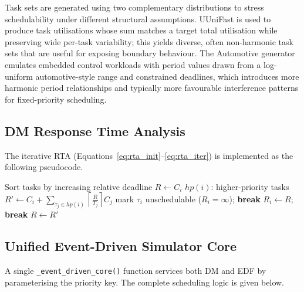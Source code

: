\documentclass[12pt,a4paper]{article}
\begin{document}
Task sets are generated using two complementary distributions to stress schedulability under different structural assumptions. UUniFast \cite{bini2005} is used to produce task utilisations whose sum matches a target total utilisation while preserving wide per-task variability; this yields diverse, often non-harmonic task sets that are useful for exposing boundary behaviour. The Automotive generator emulates embedded control workloads with period values drawn from a log-uniform automotive-style range and constrained deadlines, which introduces more harmonic period relationships and typically more favourable interference patterns for fixed-priority scheduling.

\subsection{DM Response Time Analysis}

The iterative RTA (Equations~\ref{eq:rta_init}--\ref{eq:rta_iter}) is implemented as the following pseudocode.

\begin{algorithm}[H]
\caption{DM response-time analysis}
\label{alg:dm_rta}
\begin{algorithmic}[1]
\State Sort tasks by increasing relative deadline
    \State \(R \gets C_i\)
    \State \(hp(i)\): higher-priority tasks
        \State \(R' \gets C_i + \sum_{\tau_j \in hp(i)} \left\lceil \frac{R}{T_j} \right\rceil C_j\)
            \State mark \(\tau_i\) unschedulable (\(R_i = \infty\)); \textbf{break}
        \EndIf
            \State \(R_i \gets R\); \textbf{break}
        \EndIf
        \State \(R \gets R'\)
    \EndWhile
\EndFor
\end{algorithmic}
\end{algorithm}

\subsection{Unified Event-Driven Simulator Core}

A single \texttt{\_event\_driven\_core()} function services both DM and EDF by parameterising the priority key. The complete scheduling logic is given below.
\end{document}
